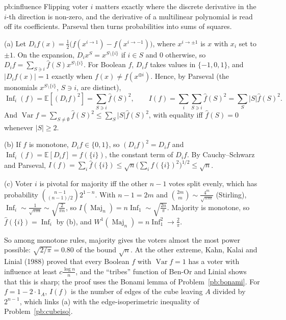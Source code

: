 \begin{solution}{pb:influence}
\idea Flipping voter $i$ matters exactly where the discrete derivative in the $i$-th direction is non-zero, and the derivative of a
multilinear polynomial is read off its coefficients. Parseval then turns probabilities into sums of squares.

\writeup (a) Let $D_if(x)=\frac12\bigl(f(x^{i\to1})-f(x^{i\to-1})\bigr)$, where $x^{i\to\pm1}$ is $x$ with $x_i$ set to $\pm1$. On the expansion, $D_ix^S=x^{S\setminus\{i\}}$ if
$i\in S$ and $0$ otherwise, so $D_if=\sum_{S\ni i}\hat f(S)x^{S\setminus\{i\}}$. For Boolean $f$, $D_if$ takes values in $\{-1,0,1\}$, and $|D_if(x)|=1$ exactly when
$f(x)\ne f(x^{\oplus i})$. Hence, by Parseval (the monomials $x^{S\setminus\{i\}}$, $S\ni i$, are distinct),
\[
\operatorname{Inf}_i(f)=\mathbb E[(D_if)^2]=\sum_{S\ni i}\hat f(S)^2,\qquad I(f)=\sum_i\sum_{S\ni i}\hat f(S)^2=\sum_S|S|\hat f(S)^2.
\]
And $\operatorname{Var}f=\sum_{S\ne\emptyset}\hat f(S)^2\le\sum_S|S|\hat f(S)^2$, with equality iff $\hat f(S)=0$ whenever $|S|\ge2$.

(b) If $f$ is monotone, $D_if\in\{0,1\}$, so $(D_if)^2=D_if$ and $\operatorname{Inf}_i(f)=\mathbb E[D_if]=\hat f(\{i\})$, the constant term of $D_if$. By Cauchy--Schwarz and
Parseval, $I(f)=\sum_i\hat f(\{i\})\le\sqrt n\bigl(\sum_i\hat f(\{i\})^2\bigr)^{1/2}\le\sqrt n$.

(c) Voter $i$ is pivotal for majority iff the other $n-1$ votes split evenly, which has probability $\binom{n-1}{(n-1)/2}2^{1-n}$. With $n-1=2m$ and
$\binom{2m}m\sim\frac{4^m}{\sqrt{\pi m}}$ (Stirling), $\operatorname{Inf}_i\sim\frac1{\sqrt{\pi m}}\sim\sqrt{\frac2{\pi n}}$, so $I(\operatorname{Maj}_n)=n\operatorname{Inf}_1\sim\sqrt{\frac{2n}\pi}$. Majority is monotone, so
$\hat f(\{i\})=\operatorname{Inf}_i$ by (b), and $W^1(\operatorname{Maj}_n)=n\operatorname{Inf}_1^2\to\frac2\pi$.

\leads So among monotone rules, majority gives the voters almost the most power possible: $\sqrt{2/\pi}=0.80$ of the bound $\sqrt n$. At the
other extreme, Kahn, Kalai and Linial (1988) proved that every Boolean $f$ with $\operatorname{Var}f=1$ has a voter with influence at least $c\frac{\log n}n$,
and the ``tribes'' function of Ben-Or and Linial shows that this is sharp; the proof uses the Bonami lemma of Problem~\ref{pb:bonami}.
For $f=1-2\cdot1_A$, $I(f)$ is the number of edges of the cube leaving $A$ divided by $2^{n-1}$, which links (a) with the edge-isoperimetric
inequality of Problem~\ref{pb:cubeiso}.
\end{solution}

